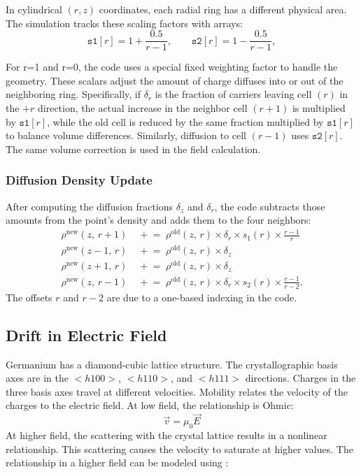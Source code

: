 In cylindrical $(r,z)$ coordinates, each radial ring has a different physical area. The simulation tracks these scaling factors with arrays:
\[
\texttt{s1}[r] = 1 + \frac{0.5}{r-1}, 
\qquad
\texttt{s2}[r] = 1 - \frac{0.5}{r-1},
\] 

For r=1 and r=0, the code uses a special fixed weighting factor to handle the geometry. These scalars adjust the amount of charge diffuses into or out of the neighboring ring. Specifically, if $\delta_r$ is the fraction of carriers leaving cell $(r)$ in
the $+r$ direction, the actual increase in the neighbor cell
$(r+1)$ is multiplied by $\texttt{s1}[r]$, while the old cell is
reduced by the same fraction multiplied by $\texttt{s1}[r]$ to
balance volume differences. Similarly, diffusion to cell $(r-1)$ 
uses $\texttt{s2}[r]$. The same volume correction is used in the field calculation.

\subsubsection*{Diffusion Density Update}

After computing the diffusion fractions $\delta_z$ and $\delta_r$, the code subtracts those amounts from the point's density and adds them to the four neighbors:
\begin{align}
  \rho^{\mathrm{new}}(z,\,r+1) &\;\mathrel{+}= \;\rho^{\mathrm{old}}(z,\,r)\times\delta_r \times s_1(r) \times \frac{r-1}{r} \label{ch3:eq:diffusion_update_1} \\
  \rho^{\mathrm{new}}(z-1,\,r) &\;\mathrel{+}= \;\rho^{\mathrm{old}}(z,\,r)\times\delta_z \label{ch3:eq:diffusion_update_2} \\
  \rho^{\mathrm{new}}(z+1,\,r) &\;\mathrel{+}= \;\rho^{\mathrm{old}}(z,\,r)\times\delta_z \label{ch3:eq:diffusion_update_3} \\
  \rho^{\mathrm{new}}(z,\,r-1) &\;\mathrel{+}= \;\rho^{\mathrm{old}}(z,\,r) \times \delta_r \times s_2(r) \times\frac{r-1}{r-2} \label{ch3:eq:diffusion_update_4}.
\end{align}
 The offsets $r$ and $r-2$ are due to a one-based indexing in the code.
 
\subsection{Drift in Electric Field}
Germanium has a diamond-cubic lattice structure. The crystallographic basis axes are in the $<h100>$, $<h110>$, and $<h111>$ directions. Charges in the three basis axes travel at different velocities. Mobility relates the velocity of the charges to the electric field. At low field, the relationship is Ohmic:
\begin{equation}
\vec{v} = \mu_0 \vec{E}
\end{equation}
At higher field, the scattering with the crystal lattice results in a nonlinear relationship. This scattering causes the velocity to saturate at higher values. The relationship in a higher field can be modeled using \cite{Caughey_1448053}:

